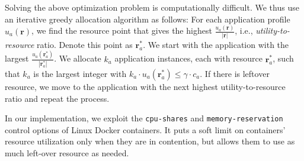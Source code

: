 Solving the above optimization problem is computationally difficult. We thus use an
iterative greedy allocation algorithm as follows:
For each application profile $u_a(\mathbf{r})$, we find the resource point that gives
the highest $\frac{u_a(\mathbf{r})}{|\mathbf{r}|}$, i.e., \emph{utility-to-resource} ratio. 
Denote this point as $\mathbf{r}^*_a$. We start with the application with the largest 
$\frac{u_a(\mathbf{r}^*_a)}{|\mathbf{r}^*_a|}$. We allocate $k_a$ application instances,
each with resource $\mathbf{r}^*_a$, such that $k_a$ is the largest integer with
$k_a \cdot u_a(\mathbf{r}^*_a) \le \gamma \cdot c_a$. 
If there is leftover resource, we move to the application with the next highest 
utility-to-resource ratio and repeat the process.

In our implementation,
we exploit the \texttt{cpu-shares} and \texttt{memory-reservation} control options 
of Linux Docker containers. It puts a soft limit on containers' resource utilization only when 
they are in contention, but allows them to use as much left-over resource as needed.